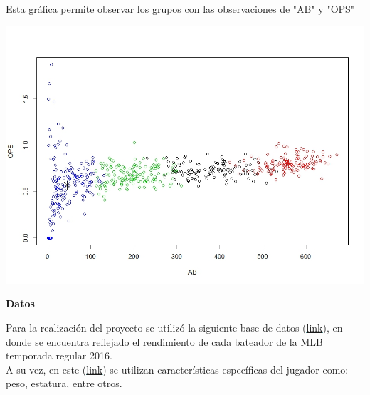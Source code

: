\documentclass[11pt,letterpaper]{report}
\begin{document}
   Esta gr\'afica permite observar los grupos con las observaciones de "AB" y "OPS"
   
   \includegraphics[scale=0.5]{Grupos.jpeg} \\
   
   
   \begin{center}
   	\textbf{\large Datos}
   \end{center}
   
   Para la realizaci\'on del proyecto se utiliz\'o la siguiente base de datos (\textcolor{cyan}{\underline{\href{http://mlb.mlb.com/stats/}{link}}}), en donde se encuentra reflejado el rendimiento de cada bateador de la MLB temporada regular 2016.\\ 
   
   A su vez, en este (\textcolor{cyan}{\underline{\href{http://m.mlb.com/player/408234/miguel-cabrera}{link}}}) se utilizan características específicas del jugador como: peso, estatura, entre otros.\\ 
   
\end{document}
